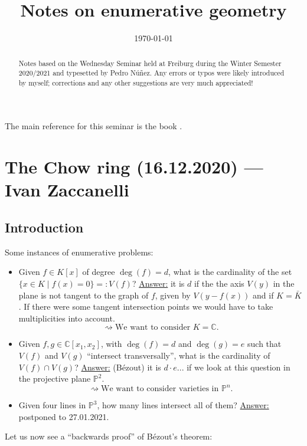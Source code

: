 \documentclass[12pt,a4paper]{amsart}
\title[Notes on enumerative geometry]{Notes on enumerative geometry}
\author[Pedro N\'{u}\~{n}ez]{}
\date{\today}
\theoremstyle{plain}
\theoremstyle{definition}
\theoremstyle{remark}
\begin{document}
\maketitle

\begin{abstract}
	Notes based on the Wednesday Seminar held at Freiburg during the Winter Semester 2020/2021 and typesetted by Pedro N\'{u}\~{n}ez.
	Any errors or typos were likely introduced by myself; corrections and any other suggestions are very much appreciated!
\end{abstract}

\tableofcontents

The main reference for this seminar is the book \cite{eh16}.

\section{The Chow ring (16.12.2020) --- Ivan Zaccanelli}

\subsection{Introduction}

Some instances of enumerative problems:

\begin{itemize}
    \item Given $f\in K[x]$ of degree $\deg(f)=d$, what is the cardinality of the set $\{ x\in K\mid f(x)=0\}=:V(f)$?
	\underline{Answer:} it is $d$ if the the axis $V(y)$ in the plane is not tangent to the graph of $f$, given by $V(y-f(x))$ and if $K=\bar{K}$.
	If there were some tangent intersection points we would have to take multiplicities into account.
	\[ \rightsquigarrow \text{We want to consider }K=\mathbb{C}. \]
    \item Given $f,g\in \mathbb{C}[x_{1},x_{2}]$, with $\deg(f)=d$ and $\deg(g)=e$ such that $V(f)$ and $V(g)$ ``intersect transversally'', what is the cardinality of $V(f)\cap V(g)$?
	\underline{Answer:} (Bézout) it is $d\cdot e$... if we look at this question in the projective plane $\mathbb{P}^{2}$.
	\[ \rightsquigarrow \text{We want to consider varieties in }\mathbb{P}^{n}. \]
    \item Given four lines in $\mathbb{P}^{3}$, how many lines intersect all of them?
	\underline{Answer:} postponed to 27.01.2021.
\end{itemize}

Let us now see a ``backwards proof'' of Bézout's theorem:
\end{document}

